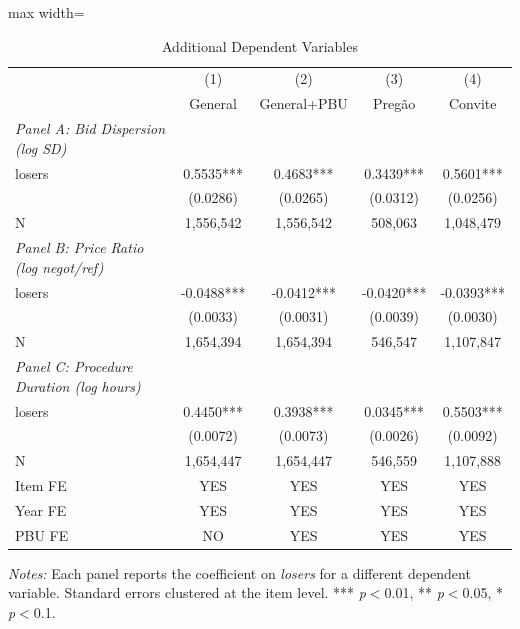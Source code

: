 \begin{table}[htbp]
\centering
\caption{Additional Dependent Variables}
\label{tab:additional_dvs}
\begin{adjustbox}{max width=\textwidth}
\begin{threeparttable}
\small
\begin{tabular}{lcccc}
\toprule
 & (1) & (2) & (3) & (4) \\
 & General & General+PBU & Preg\~{a}o & Convite \\
\midrule
\textit{Panel A: Bid Dispersion (log SD)} & & & & \\
\quad losers & 0.5535*** & 0.4683*** & 0.3439*** & 0.5601*** \\
\quad & (0.0286) & (0.0265) & (0.0312) & (0.0256) \\
\quad N & 1,556,542 & 1,556,542 & 508,063 & 1,048,479 \\
[6pt]
\textit{Panel B: Price Ratio (log negot/ref)} & & & & \\
\quad losers & -0.0488*** & -0.0412*** & -0.0420*** & -0.0393*** \\
\quad & (0.0033) & (0.0031) & (0.0039) & (0.0030) \\
\quad N & 1,654,394 & 1,654,394 & 546,547 & 1,107,847 \\
[6pt]
\textit{Panel C: Procedure Duration (log hours)} & & & & \\
\quad losers & 0.4450*** & 0.3938*** & 0.0345*** & 0.5503*** \\
\quad & (0.0072) & (0.0073) & (0.0026) & (0.0092) \\
\quad N & 1,654,447 & 1,654,447 & 546,559 & 1,107,888 \\
\midrule
Item FE & YES & YES & YES & YES \\
Year FE & YES & YES & YES & YES \\
PBU FE & NO & YES & YES & YES \\
\bottomrule
\end{tabular}
\begin{tablenotes}
\small
\item \textit{Notes:} Each panel reports the coefficient on \textit{losers}
for a different dependent variable. Standard errors clustered at the item level.
*** \textit{p}$<$0.01, ** \textit{p}$<$0.05, * \textit{p}$<$0.1.
\end{tablenotes}
\end{threeparttable}
\end{adjustbox}
\end{table}

